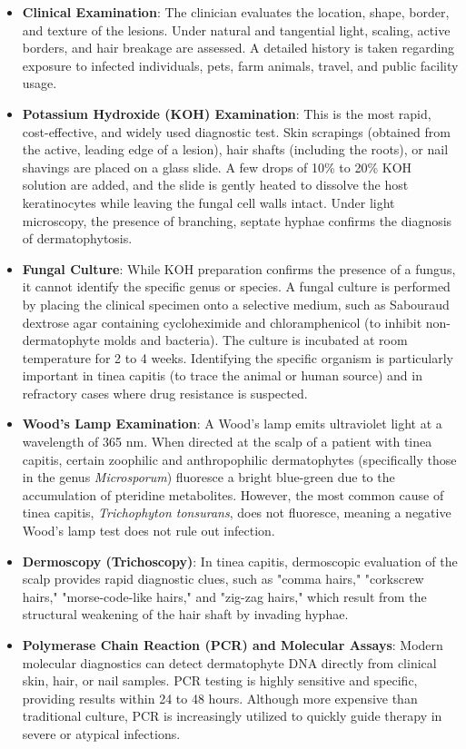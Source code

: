 \begin{itemize}
    \item \textbf{Clinical Examination}: The clinician evaluates the location, shape, border, and texture of the lesions. Under natural and tangential light, scaling, active borders, and hair breakage are assessed. A detailed history is taken regarding exposure to infected individuals, pets, farm animals, travel, and public facility usage.
    \item \textbf{Potassium Hydroxide (KOH) Examination}: This is the most rapid, cost-effective, and widely used diagnostic test. Skin scrapings (obtained from the active, leading edge of a lesion), hair shafts (including the roots), or nail shavings are placed on a glass slide. A few drops of 10\% to 20\% KOH solution are added, and the slide is gently heated to dissolve the host keratinocytes while leaving the fungal cell walls intact. Under light microscopy, the presence of branching, septate hyphae confirms the diagnosis of dermatophytosis.
    \item \textbf{Fungal Culture}: While KOH preparation confirms the presence of a fungus, it cannot identify the specific genus or species. A fungal culture is performed by placing the clinical specimen onto a selective medium, such as Sabouraud dextrose agar containing cycloheximide and chloramphenicol (to inhibit non-dermatophyte molds and bacteria). The culture is incubated at room temperature for 2 to 4 weeks. Identifying the specific organism is particularly important in tinea capitis (to trace the animal or human source) and in refractory cases where drug resistance is suspected.
    \item \textbf{Wood's Lamp Examination}: A Wood's lamp emits ultraviolet light at a wavelength of 365 nm. When directed at the scalp of a patient with tinea capitis, certain zoophilic and anthropophilic dermatophytes (specifically those in the genus \textit{Microsporum}) fluoresce a bright blue-green due to the accumulation of pteridine metabolites. However, the most common cause of tinea capitis, \textit{Trichophyton tonsurans}, does not fluoresce, meaning a negative Wood's lamp test does not rule out infection.
    \item \textbf{Dermoscopy (Trichoscopy)}: In tinea capitis, dermoscopic evaluation of the scalp provides rapid diagnostic clues, such as "comma hairs," "corkscrew hairs," "morse-code-like hairs," and "zig-zag hairs," which result from the structural weakening of the hair shaft by invading hyphae.
    \item \textbf{Polymerase Chain Reaction (PCR) and Molecular Assays}: Modern molecular diagnostics can detect dermatophyte DNA directly from clinical skin, hair, or nail samples. PCR testing is highly sensitive and specific, providing results within 24 to 48 hours. Although more expensive than traditional culture, PCR is increasingly utilized to quickly guide therapy in severe or atypical infections.
\end{itemize}

